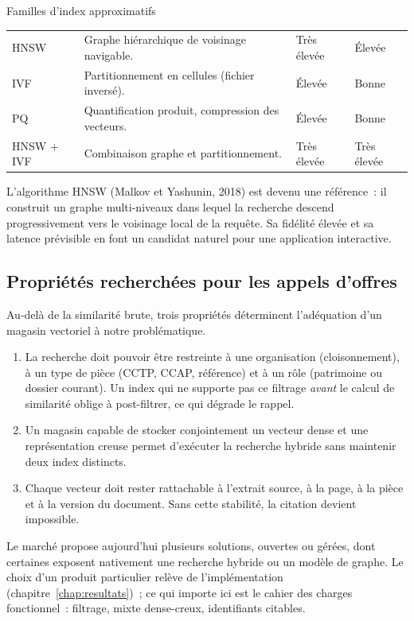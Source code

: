 \begin{btptable}{Familles d'index approximatifs}
\label{tab:index-ann}
\begin{tabularx}{\linewidth}{@{}L{2.6cm} Y C{2.2cm} C{2.2cm}@{}}
\toprule
{}
 &  &  &  \\
\midrule
HNSW & Graphe hiérarchique de voisinage navigable. & Très élevée & Élevée \\
IVF & Partitionnement en cellules (fichier inversé). & Élevée & Bonne \\
PQ & Quantification produit, compression des vecteurs. & Élevée & Bonne \\
HNSW + IVF & Combinaison graphe et partitionnement. & Très élevée & Très élevée \\
\bottomrule
\end{tabularx}
\end{btptable}

L'algorithme HNSW (Malkov et Yashunin, 2018) est devenu une référence~: il
construit un graphe multi-niveaux dans lequel la recherche descend
progressivement vers le voisinage local de la requête. Sa fidélité élevée et
sa latence prévisible en font un candidat naturel pour une application
interactive.

\subsection{Propriétés recherchées pour les appels d'offres}

Au-delà de la similarité brute, trois propriétés déterminent l'adéquation
d'un magasin vectoriel à notre problématique.

\begin{enumerate}
  \item {} La recherche doit pouvoir être
        restreinte à une organisation (cloisonnement), à un type de pièce
        (CCTP, CCAP, référence) et à un rôle (patrimoine ou dossier courant).
        Un index qui ne supporte pas ce filtrage \emph{avant} le calcul de
        similarité oblige à post-filtrer, ce qui dégrade le rappel.
  \item {} Un magasin capable de stocker
        conjointement un vecteur dense et une représentation creuse permet
        d'exécuter la recherche hybride sans maintenir deux index distincts.
  \item {} Chaque vecteur doit rester rattachable
        à l'extrait source, à la page, à la pièce et à la version du
        document. Sans cette stabilité, la citation devient impossible.
\end{enumerate}

Le marché propose aujourd'hui plusieurs solutions, ouvertes ou gérées, dont
certaines exposent nativement une recherche hybride ou un modèle de graphe.
Le choix d'un produit particulier relève de l'implémentation
(chapitre~\ref{chap:resultats})~; ce qui importe ici est le cahier des charges
fonctionnel~: filtrage, mixte dense-creux, identifiants citables.
